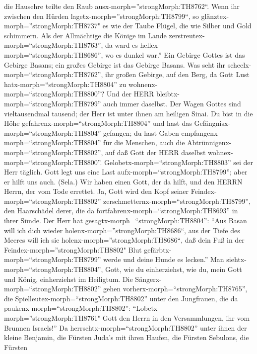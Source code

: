 die Hausehre teilte den Raub ausx-morph=''strongMorph:TH8762``.
 Wenn ihr zwischen den Hürden
lagetx-morph=''strongMorph:TH8799``, so
glänztex-morph=''strongMorph:TH8737" es wie der Taube Flügel, die wie
Silber und Gold schimmern.  Als der Allmächtige die Könige
im Lande zerstreutex-morph=``strongMorph:TH8763'', da ward es
hellex-morph=``strongMorph:TH8686'', wo es dunkel war.'' 
Ein Gebirge Gottes ist das Gebirge Basans; ein großes Gebirge ist das
Gebirge Basans.  Was seht ihr
scheelx-morph=``strongMorph:TH8762'', ihr großen Gebirge, auf den Berg,
da Gott Lust hatx-morph=``strongMorph:TH8804'' zu
wohnenx-morph=``strongMorph:TH8800''? Und der HERR
bleibtx-morph=``strongMorph:TH8799'' auch immer daselbst. 
Der Wagen Gottes sind vieltausendmal tausend; der Herr ist unter ihnen
am heiligen Sinai.  Du bist in die Höhe
gefahrenx-morph=``strongMorph:TH8804'' und hast das
Gefängnisx-morph=``strongMorph:TH8804'' gefangen; du hast Gaben
empfangenx-morph=``strongMorph:TH8804'' für die Menschen, auch die
Abtrünnigenx-morph=``strongMorph:TH8802'', auf daß Gott der HERR
daselbst wohnex-morph=``strongMorph:TH8800''. 
Gelobetx-morph=``strongMorph:TH8803'' sei der Herr täglich. Gott legt
uns eine Last aufx-morph=``strongMorph:TH8799''; aber er hilft uns auch.
(Sela.)  Wir haben einen Gott, der da hilft, und den HERRN
Herrn, der vom Tode errettet.  Ja, Gott wird den Kopf
seiner Feindex-morph=``strongMorph:TH8802''
zerschmetternx-morph=``strongMorph:TH8799'', den Haarschädel derer, die
da fortfahrenx-morph=``strongMorph:TH8693'' in ihrer Sünde.
 Der Herr hat gesagtx-morph=``strongMorph:TH8804'': ``Aus
Basan will ich dich wieder holenx-morph=''strongMorph:TH8686``, aus der
Tiefe des Meeres will ich sie holenx-morph=''strongMorph:TH8686``,
 daß dein Fuß in der Feindex-morph=''strongMorph:TH8802"
Blut gefärbtx-morph=``strongMorph:TH8799'' werde und deine Hunde es
lecken.''  Man siehtx-morph=``strongMorph:TH8804'', Gott,
wie du einherziehst, wie du, mein Gott und König, einherziehst im
Heiligtum.  Die Sängerx-morph=``strongMorph:TH8802'' gehen
vorherx-morph=``strongMorph:TH8765'', die
Spielleutex-morph=``strongMorph:TH8802'' unter den Jungfrauen, die da
paukenx-morph=``strongMorph:TH8802'': 
``Lobetx-morph=''strongMorph:TH8761" Gott den Herrn in den
Versammlungen, ihr vom Brunnen Israels!''  Da
herrschtx-morph=``strongMorph:TH8802'' unter ihnen der kleine Benjamin,
die Fürsten Juda's mit ihren Haufen, die Fürsten Sebulons, die Fürsten
